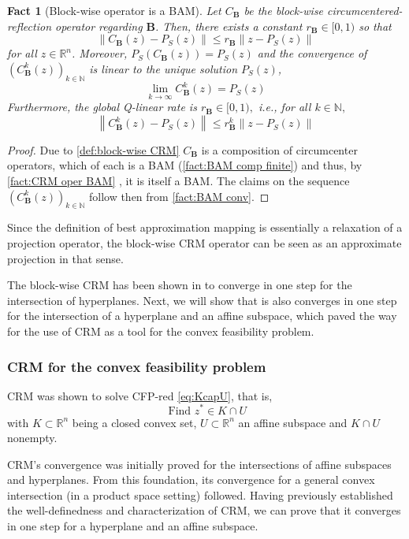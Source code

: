 \documentclass[smallextended,numbook,nospthms]{svjour3}
\theoremstyle{plain}
\newtheorem{fact}[theorem]{Fact}
\theoremstyle{definition}
\def\RR{\mathds R}
\def\NN{\mathds N}
\begin{document}
\begin{fact}[Block-wise operator is a BAM]\label{fact: block-wise CRM oper BAM}
	Let $C_{\mathbf{B}}$ be the block-wise circumcentered-reflection operator regarding
	$\mathbf{B}$. Then, there exists a constant $r_{\mathbf{B}} \in[0,1)$ so that
	$$
	\left\|C_{\mathbf{B}}(z)-P_{S}(z)\right\| \leq r_{\mathbf{B}}\left\|z-P_{S}(z)\right\|
	$$
	for all $z \in \RR^{n}$. Moreover, $P_{S}\left(C_{\mathbf{B}}(z)\right)=P_{S}(z)$ and the convergence of $\left(C_{\mathbf{B}}^{k}(z)\right)_{k \in \NN}$ is linear to the unique solution $P_{S}(z)$,
	$$
	\lim _{k \rightarrow \infty} C_{\mathbf{B}}^{k}(z)=P_{S}(z)
	$$
	Furthermore, the global Q-linear rate is $r_{\mathbf{B}} \in[0,1),$ i.e., for all $k \in \NN,$
	$$
	\left\|C_{\mathbf{B}}^{k}(z)-P_{S}(z)\right\| \leq r_{\mathbf{B}}^{k}\left\|z-P_{S}(z)\right\|
	$$
\end{fact}
\begin{proof}
	Due to \cref{def:block-wise CRM} $C_{\mathbf{B}}$ is a composition of circumcenter operators, which of each is a BAM (\cref{fact:BAM comp finite}) and thus, by \cref{fact:CRM oper BAM} , it is itself a BAM. The claims on the sequence $\left(C_{\mathbf{B}}^{k}(z)\right)_{k \in \NN}$ follow then from \cref{fact:BAM conv}.
\end{proof}

Since the definition of best approximation mapping is essentially a relaxation of a projection operator, the block-wise CRM operator can be seen as an approximate projection in that sense.

The block-wise CRM has been shown in \cite[Lemma 3, Lemma 4, Theorem 4]{Behling:2019dj} to converge in one step for the intersection of hyperplanes. Next, we will show that is also converges in one step for the intersection of a hyperplane and an affine subspace, which paved the way for the use of CRM as a tool for the convex feasibility problem.

\subsubsection{CRM for the convex feasibility problem}
CRM was shown to solve CFP-red \cref{eq:KcapU}, that is, 
\[
\text { Find } z^{*} \in K \cap U
\]
with $K \subset \RR^{n}$ being a closed convex set, $U \subset \RR^{n}$ an affine subspace and $K \cap U$ nonempty.

CRM's convergence was initially proved for the intersections of affine subspaces and hyperplanes. From this foundation, its convergence for a general convex intersection (in a product space setting) followed. Having previously established the well-definedness and characterization of CRM, we can prove that it converges in one step for a hyperplane and an affine subspace.
\end{document}
